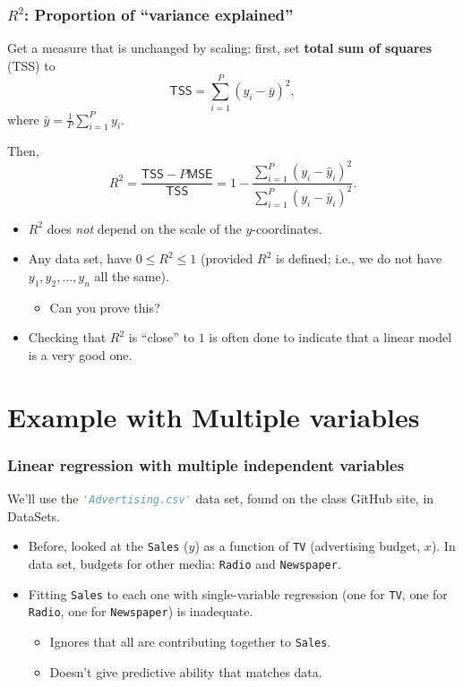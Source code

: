 \documentclass{beamer}
\theoremstyle{example}
\newcommand{\ct}[1]{\lstinline[language=Python]!#1!}
\newcommand{\ttt}[1]{{\small\texttt{#1}}}
\begin{document}
\begin{frame}
    \frametitle{$R^2$: Proportion of ``variance explained''}
    Get a measure that is unchanged by scaling: first, set \textbf{total sum of squares} (TSS) to 
    \[\textsf{TSS} = \sum_{i=1}^P(y_i - \bar{y})^2,\]
    where $\bar{y} = \frac{1}{P}\sum_{i=1}^P y_i$.

    \pause 
    Then, 
        \[R^2 = \frac{\textsf{TSS} - P\textsf{MSE}}{\textsf{TSS}} = 1 - \frac{\sum_{i=1}^P(y_i - \hat{y}_i)^2}{\sum_{i=1}^P(y_i - \bar{y}_i)^2}.\]
    \pause
    \begin{itemize}
        \item $R^2$ does \emph{not} depend on the scale of the $y$-coordinates.
        \pause
        \item Any data set, have $0\le R^2\le 1$ (provided $R^2$ is defined; i.e., we do not have $y_1,y_2,\ldots,y_n$ all the same).
        \begin{itemize}
            \item Can you prove this?
        \end{itemize}
        \pause
        \item Checking that $R^2$ is ``close'' to $1$ is often done to indicate that a linear model is a very good one.
    \end{itemize}
\end{frame}

\section{Example with Multiple variables}

\begin{frame}
\frametitle{Linear regression with multiple independent variables}
We'll use the \ct{'Advertising.csv'} data set, found on the class GitHub site, in DataSets.

\pause
\begin{itemize}
    \item Before, looked at the \ttt{Sales} ($y$) as a function of \ttt{TV} (advertising budget, $x$). In data set, budgets for other media: \ttt{Radio} and \ttt{Newspaper}.
    \pause
    \item Fitting \ttt{Sales} to each one with single-variable regression (one for \ttt{TV}, one for \ttt{Radio}, one for \ttt{Newspaper}) is inadequate. 
    \pause
    \begin{itemize}
        \item Ignores that all are contributing together to \ttt{Sales}.
        \item Doesn't give predictive ability that matches data.
    \end{itemize}
\end{itemize}

\end{frame}
\end{document}
